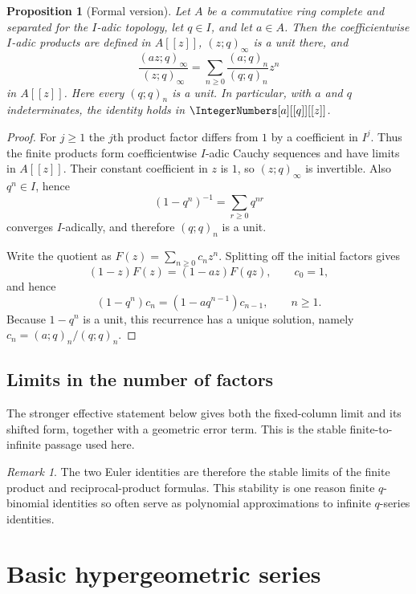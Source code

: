 \documentclass[11pt,a4paper,oneside,openany]{book}
\newtheorem{proposition}[proposition]{Proposition}
\theoremstyle{definition}
\theoremstyle{remark}
\newtheorem{remark}[remark]{Remark}
\begin{document}
\begin{proposition}[Formal version]\label{prop:formal-qbinomial}
Let $A$ be a commutative ring complete and separated for the $I$-adic
topology, let $q\in I$, and let $a\in A$.  Then the coefficientwise $I$-adic
products are defined in $A[[z]]$, $(z;q)_\infty$ is a unit there, and
\[
 \frac{(az;q)_\infty}{(z;q)_\infty}
 =\sum_{n\ge0}\frac{(a;q)_n}{(q;q)_n}z^n
\]
in $A[[z]]$.  Here every $(q;q)_n$ is a unit.  In particular, with $a$ and
$q$ indeterminates, the identity holds in
$\IntegerNumbers[a][[q]][[z]]$.
\end{proposition}

\begin{proof}
For $j\ge1$ the $j$th product factor differs from $1$ by a coefficient in
$I^j$.  Thus the finite products form coefficientwise $I$-adic Cauchy
sequences and have limits in $A[[z]]$.  Their constant coefficient in $z$ is
$1$, so $(z;q)_\infty$ is invertible.  Also $q^n\in I$, hence
\[
 (1-q^n)^{-1}=\sum_{r\ge0}q^{nr}
\]
converges $I$-adically, and therefore $(q;q)_n$ is a unit.

Write the quotient as $F(z)=\sum_{n\ge0}c_nz^n$.  Splitting off the initial
factors gives
\[
 (1-z)F(z)=(1-az)F(qz),\qquad c_0=1,
\]
and hence
\[
 (1-q^n)c_n=(1-aq^{n-1})c_{n-1},
 \qquad n\ge1.
\]
Because $1-q^n$ is a unit, this recurrence has a unique solution, namely
$c_n=(a;q)_n/(q;q)_n$.
\end{proof}

\section{Limits in the number of factors}

The stronger effective statement  below gives
both the fixed-column limit and its shifted form, together with a geometric
error term.  This is the stable finite-to-infinite passage used here.

\begin{remark}
The two Euler identities are therefore the stable limits of the finite product and reciprocal-product formulas.  This stability is one reason finite $q$-binomial identities so often serve as polynomial approximations to infinite $q$-series identities.
\end{remark}

\chapter{Basic hypergeometric series}\label{chap:basic-hypergeometric}
\end{document}
